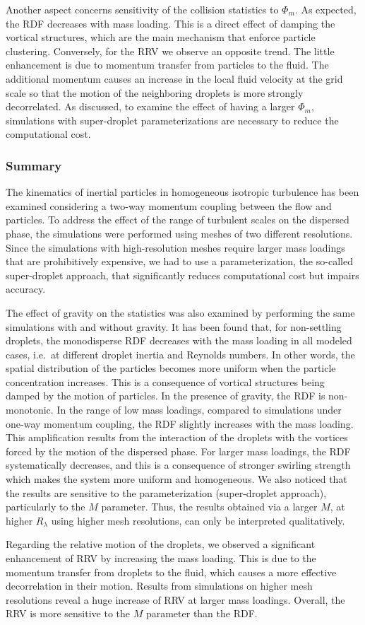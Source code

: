 \documentclass[../thesis.tex]{subfiles}
\begin{document}
Another aspect concerns sensitivity of the collision statistics to $\Phi_m$. As expected, the RDF decreases with mass loading. This is a direct effect of damping the vortical structures, which are the main mechanism that enforce particle clustering. Conversely, for the RRV we observe an opposite trend. The little enhancement is due to momentum transfer from particles to the fluid. The additional momentum causes an increase in the local fluid velocity at the grid scale so that the motion of the neighboring droplets is more strongly decorrelated. As discussed, to examine the effect of having a larger $\Phi_m$, simulations with super-droplet parameterizations are necessary to reduce the computational cost.

\subsubsection{Summary}
The kinematics of inertial particles in homogeneous isotropic turbulence has been examined considering a two-way momentum coupling between the flow and particles. To address the effect of the range of turbulent scales on the dispersed phase, the simulations were performed using meshes of two different resolutions. Since the simulations with high-resolution meshes require larger mass loadings that are prohibitively expensive, we had to use a parameterization, the so-called super-droplet approach, that significantly reduces computational cost but impairs accuracy.

The effect of gravity on the statistics was also examined by performing the same simulations with and without gravity. It has been found that, for non-settling droplets, the monodisperse RDF decreases with the mass loading in all modeled cases, i.e.\ at different droplet inertia and Reynolds numbers. In other words, the spatial distribution of the particles becomes more uniform when the particle concentration increases. This is a consequence of vortical structures being damped by the motion of particles. In the presence of gravity, the RDF is non-monotonic. In the range of low mass loadings, compared to simulations under one-way momentum coupling, the RDF slightly increases with the mass loading. This amplification results from the interaction of the droplets with the vortices forced by the motion of the dispersed phase. For larger mass loadings, the RDF systematically decreases, and this is a consequence of stronger swirling strength which makes the system more uniform and homogeneous. We also noticed that the results are sensitive to the parameterization (super-droplet approach), particularly to the $M$ parameter. Thus, the results obtained via a larger $M$, at higher $R_{\lambda}$ using higher mesh resolutions, can only be interpreted qualitatively.

Regarding the relative motion of the droplets, we observed a significant enhancement of RRV by increasing the mass loading. This is due to the momentum transfer from droplets to the fluid, which causes a more effective decorrelation in their motion. Results from simulations on higher mesh resolutions reveal a huge increase of RRV at larger mass loadings. Overall, the RRV is more sensitive to the $M$ parameter than the RDF.

%
%
\newpage
\end{document}
